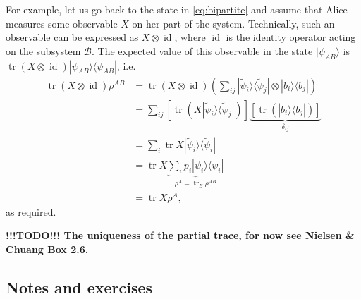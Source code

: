 \documentclass{article}
\begin{document}
For example, let us go back to the state in \eqref{eq:bipartite} and assume that Alice measures some observable \(X\) on her part of the system.
Technically, such an observable can be expressed as \(X\otimes \operatorname{id}\), where \(\operatorname{id}\) is the identity operator acting on the subsystem \(\mathcal{B}\).
The expected value of this observable in the state \(|\psi_{AB}\rangle\) is \(\operatorname{tr}(X\otimes\operatorname{id})|\psi_{AB}\rangle\langle\psi_{AB}|\), i.e.
\[
  \begin{aligned}
    \operatorname{tr}(X\otimes \operatorname{id}) \rho^{AB}
    &= \operatorname{tr}(X\otimes\operatorname{id}) \left(
        \sum_{ij} |\widetilde\psi_i\rangle\langle\widetilde\psi_j| \otimes |b_i\rangle\langle b_j|
      \right)
  \\&= \sum_{ij} \left[
        \operatorname{tr}\left(X |\widetilde\psi_i\rangle\langle\widetilde\psi_j|\right)
      \right]
      \underbrace{\left[\operatorname{tr}\left(|b_i\rangle\langle b_j|\right)\right]}_{\delta_{ij}}
  \\&= \sum_i \operatorname{tr}X |\widetilde\psi_i\rangle\langle\widetilde\psi_i|
  \\&= \operatorname{tr}X \underbrace{\sum_i p_i|\psi_i\rangle\langle\psi_i|}_{\rho^A = \operatorname{tr}_B\rho^{AB}}
  \\&= \operatorname{tr}X\rho^A,
  \end{aligned}
\]
as required.

\textbf{!!!TODO!!! The uniqueness of the partial trace, for now see Nielsen \& Chuang Box 2.6.}

\hypertarget{notes-and-exercises-1}{%
\subsection{Notes and exercises}\label{notes-and-exercises-1}}
\end{document}
